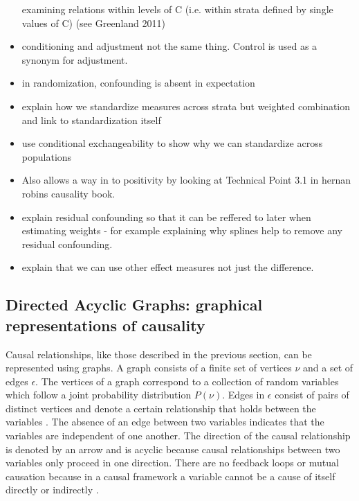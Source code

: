 \documentclass[11pt]{article}
\begin{document}
\begin{itemize}
  examining relations within levels of C (i.e. within strata defined by
  single values of C) (see Greenland 2011)
\item
  conditioning and adjustment not the same thing. Control is used as a
  synonym for adjustment.
\item
  in randomization, confounding is absent in expectation
\item
  explain how we standardize measures across strata but weighted
  combination and link to standardization itself
\item
  use conditional exchangeability to show why we can standardize across
  populations
\item
  Also allows a way in to positivity by looking at Technical Point 3.1
  in hernan robins causality book.
\item
  explain residual confounding so that it can be reffered to later when
  estimating weights - for example explaining why splines help to remove
  any residual confounding.
\item
  explain that we can use other effect measures not just the difference.
\end{itemize}

    \subsection{Directed Acyclic Graphs: graphical representations of
causality}\label{directed-acyclic-graphs-graphical-representations-of-causality}

Causal relationships, like those described in the previous section, can
be represented using graphs. A graph consists of a finite set of
vertices \(\nu\) and a set of edges \(\epsilon\). The vertices of a
graph correspond to a collection of random variables which follow a
joint probability distribution \(P(\nu)\). Edges in \(\epsilon\) consist
of pairs of distinct vertices and denote a certain relationship that
holds between the variables \citet{Pearl2009}. The absence of an edge
between two variables indicates that the variables are independent of
one another. The direction of the causal relationship is denoted by an
arrow and is acyclic because causal relationships between two variables
only proceed in one direction. There are no feedback loops or mutual
causation because in a causal framework a variable cannot be a cause of
itself directly or indirectly \citet{Hernan2004}.\linebreak
\end{document}
